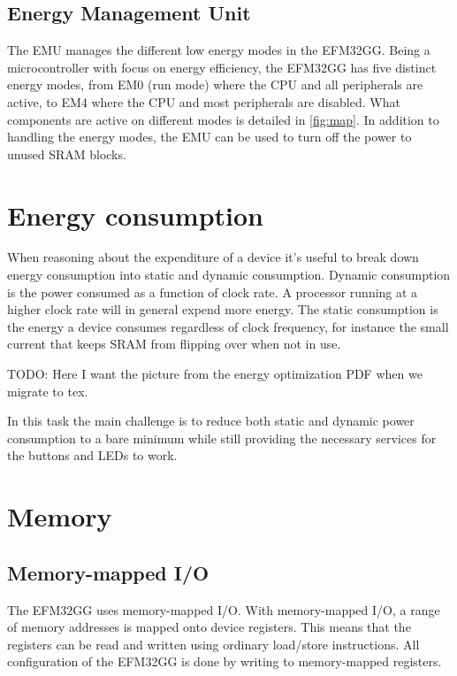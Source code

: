 \subsection{Energy Management Unit}
The EMU manages the different low energy modes in the EFM32GG. Being a microcontroller with focus on energy efficiency, the EFM32GG has five distinct energy modes, from EM0 (run mode) where the CPU and all peripherals are active, to EM4 where the CPU and most peripherals are disabled. What components are active on different modes is detailed in \ref{fig:map}. In addition to handling the energy modes, the EMU can be used to turn off the power to unused SRAM blocks.\cite{EFM32GG-RM}


\section{Energy consumption}

When reasoning about the expenditure of a device it’s useful to break down energy consumption into static and dynamic consumption. Dynamic consumption is the power consumed as a function of clock rate. A processor running at a higher clock rate will in general expend more energy. The static consumption is the energy a device consumes regardless of clock frequency, for instance the small current that keeps SRAM from flipping over when not in use.

TODO: Here I want the picture from the energy optimization PDF when we migrate to tex.

In this task the main challenge is to reduce both static and dynamic power consumption to a bare minimum while still providing the necessary services for the buttons and LEDs to work.



\section{Memory}

\subsection{Memory-mapped I/O}
The EFM32GG uses memory-mapped I/O. With memory-mapped I/O, a range of memory addresses is mapped onto device registers. This means that the registers can be read and written using ordinary load/store instructions. All configuration of the EFM32GG is done by writing to memory-mapped registers.\cite{EFM32GG-RM}

